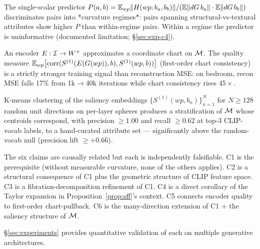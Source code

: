 \begin{claim}\label{cl:c4}
The single-scalar predictor
$P(a,b) = \mathbb{E}_{wp}\|H(wp; b_a, b_b)\| /
(\mathbb{E}\|dG\,b_a\|\cdot\mathbb{E}\|dG\,b_b\|)$
discriminates pairs into *curvature regimes*: pairs spanning
structural-vs-textural attributes show higher $P$ than within-regime
pairs. Within a regime the predictor is uninformative
(documented limitation; §\ref{sec:exp-c4}).
\end{claim}

\begin{claim}\label{cl:c5}
An encoder $E : \mathcal{I} \to W^+$ approximates a coordinate chart on
$\mathcal{M}$. The quality measure
$\mathbb{E}_{wp}\!\left[\mathrm{corr}(S^{(1)}(E(G(wp)), b),
                              S^{(1)}(wp, b))\right]$
(first-order chart consistency) is a strictly stronger training
signal than reconstruction MSE: on bedroom, recon MSE falls
17\% from 1k$\to$40k iterations while chart consistency rises
$45\times$.
\end{claim}

\begin{claim}\label{cl:c6}
K-means clustering of the saliency embeddings
$\{S^{(1)}(wp, b_n)\}_{n=1}^{N}$ for $N \geq 128$ random unit
directions on per-layer spheres produces a stratification of $\mathcal{M}$
whose centroids correspond, with precision $\geq 1.00$ and recall
$\geq 0.62$ at top-3 CLIP-vocab labels, to a hand-curated attribute
set --- significantly above the random-vocab null (precision lift
$\geq +0.66$).
\end{claim}

The six claims are causally related but each is independently
falsifiable. C1 is the prerequisite (without measurable curvature,
none of the others applies). C2 is a structural consequence of C1
plus the geometric structure of CLIP feature space. C3 is a
fibration-decomposition refinement of C1.  C4 is a direct
corollary of the Taylor expansion in
Proposition~\ref{prop:sff}'s context. C5 connects encoder quality
to first-order chart-pullback. C6 is the many-direction extension
of C1 + the saliency structure of $\mathcal{M}$.

\S\ref{sec:experiments} provides quantitative validation of each
on multiple generative architectures.
